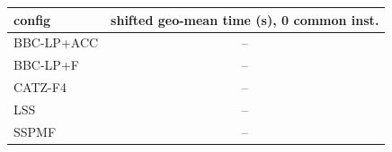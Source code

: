 \begin{tabular}{lc}
\toprule
config & shifted geo-mean time (s), 0 common inst. \\
\midrule
BBC-LP+ACC & -- \\
BBC-LP+F & -- \\
CATZ-F4 & -- \\
LSS & -- \\
SSPMF & -- \\
\bottomrule
\end{tabular}